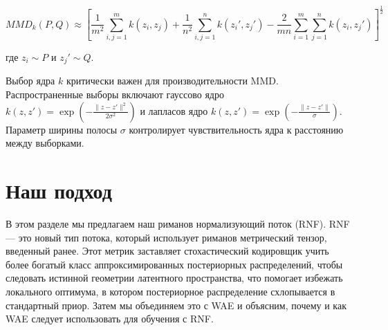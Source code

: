 \documentclass{article}
\begin{document}
\[
MMD_k(P, Q) \approx \left[ \frac{1}{m^2} \sum_{i,j=1}^m k(z_i, z_j) + \frac{1}{n^2} \sum_{i,j=1}^n k(z_i', z_j') - \frac{2}{mn} \sum_{i=1}^m \sum_{j=1}^n k(z_i, z_j') \right]^{\frac{1}{2}}
\]

где \(z_i \sim P\) и \(z_j' \sim Q\).

Выбор ядра \(k\) критически важен для производительности MMD. Распространенные выборы включают гауссово ядро \(k(z, z') = \exp(-\frac{\|z - z'\|^2}{2\sigma^2})\) и лапласов ядро \(k(z, z') = \exp(-\frac{\|z - z'\|}{\sigma})\). Параметр ширины полосы \(\sigma\) контролирует чувствительность ядра к расстоянию между выборками.

\section{Наш подход}

В этом разделе мы предлагаем наш риманов нормализующий поток (RNF). RNF — это новый тип потока, который использует риманов метрический тензор, введенный ранее. Этот метрик заставляет стохастический кодировщик учить более богатый класс аппроксимированных постериорных распределений, чтобы следовать истинной геометрии латентного пространства, что помогает избежать локального оптимума, в котором постериорное распределение схлопывается в стандартный приор. Затем мы объединяем это с WAE и объясним, почему и как WAE следует использовать для обучения с RNF.
\end{document}
